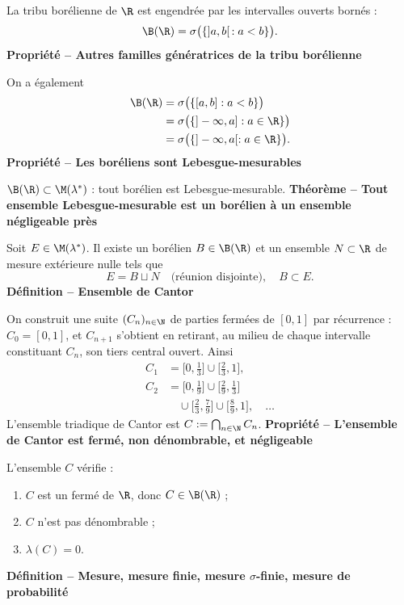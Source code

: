 La tribu borélienne de $\R$ est engendrée par les intervalles ouverts bornés :
\[\B(\R)=\sigma\bigl(\{]a,b[\, : a<b\}\bigr).\]
\textbf{Propriété – Autres familles génératrices de la tribu borélienne}

On a également
\[
\begin{aligned}
\B(\R)&=\sigma\bigl(\{[a,b]:a<b\}\bigr)\\
&=\sigma\bigl(\{]-\infty,a]:a\in\R\}\bigr)\\
&=\sigma\bigl(\{]-\infty,a[:a\in\R\}\bigr).
\end{aligned}
\]
\textbf{Propriété – Les boréliens sont Lebesgue-mesurables}

$\B(\R)\subset\M(\lambda^*)$ : tout borélien est Lebesgue-mesurable.
\textbf{Théorème – Tout ensemble Lebesgue-mesurable est un borélien à un ensemble négligeable près}

Soit $E\in\M(\lambda^*)$. Il existe un borélien $B\in\B(\R)$ et un ensemble $N\subset\R$ de mesure extérieure nulle tels que
\[E=B\sqcup N\quad\text{(réunion disjointe)},\quad B\subset E.\]
\textbf{Définition – Ensemble de Cantor}

On construit une suite $(C_n)_{n\in\N}$ de parties fermées de $[0,1]$ par récurrence : $C_0=[0,1]$, et $C_{n+1}$ s’obtient en retirant, au milieu de chaque intervalle constituant $C_n$, son tiers central ouvert. Ainsi
\[
\begin{aligned}
C_1&=\bigl[0,\tfrac13\bigr]\cup\bigl[\tfrac23,1\bigr],\\
C_2&=\bigl[0,\tfrac19\bigr]\cup\bigl[\tfrac29,\tfrac13\bigr]\\
&\quad\cup\bigl[\tfrac23,\tfrac79\bigr]\cup\bigl[\tfrac89,1\bigr],\quad\ldots
\end{aligned}
\]
L’ensemble triadique de Cantor est $C:=\bigcap_{n\in\N}C_n$.
\textbf{Propriété – L’ensemble de Cantor est fermé, non dénombrable, et négligeable}

L’ensemble $C$ vérifie :
\begin{enumerate}
\item $C$ est un fermé de $\R$, donc $C\in\B(\R)$ ;
\item $C$ n’est pas dénombrable ;
\item $\lambda(C)=0$.
\end{enumerate}
\textbf{Définition – Mesure, mesure finie, mesure $\sigma$-finie, mesure de probabilité}

